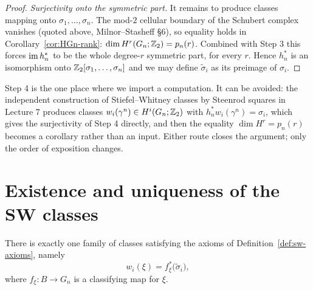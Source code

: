 \begin{proof}
 \emph{Surjectivity onto the symmetric part.} It remains to produce
classes mapping onto $\sigma_1,\dots,\sigma_n$. The mod-$2$ cellular boundary of
the Schubert complex vanishes (quoted above, Milnor--Stasheff \S 6), so equality
holds in Corollary~\ref{cor:HGn-rank}:
$\dim H^r(G_n;\mathbb{Z}_2)=p_n(r)$. Combined with Step 3 this forces
$\operatorname{im} h_n^*$ to be the whole degree-$r$ symmetric part, for every $r$. Hence
$h_n^*$ is an isomorphism onto $\mathbb{Z}_2[\sigma_1,\dots,\sigma_n]$ and we may define
$\tilde\sigma_i$ as its preimage of $\sigma_i$.
\end{proof}

\begin{remark}
Step 4 is the one place where we import a computation. It can be avoided: the
independent construction of Stiefel--Whitney classes by Steenrod squares in
Lecture 7 produces classes $w_i(\gamma^n)\in H^i(G_n;\mathbb{Z}_2)$ with
$h_n^*w_i(\gamma^n)=\sigma_i$, which gives the surjectivity of Step 4 directly,
and then the equality $\dim H^r=p_n(r)$ becomes a corollary rather than an
input. Either route closes the argument; only the order of exposition changes.
\end{remark}

\section{Existence and uniqueness of the SW classes}

\begin{theorem}
There is exactly one family of classes satisfying the axioms of
Definition~\ref{def:sw-axioms}, namely
\[
w_i(\xi)=f_\xi^*\big(\tilde\sigma_i\big),
\]
where $f_\xi\colon B\to G_n$ is a classifying map for $\xi$.
\end{theorem}

